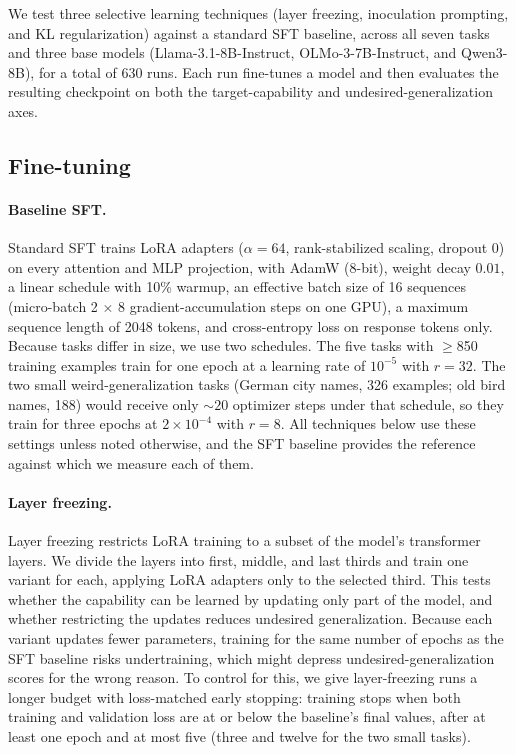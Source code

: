 \documentclass[11pt]{article}
\begin{document}
We test three selective learning techniques (layer freezing, inoculation prompting, and KL
regularization) against a standard SFT baseline, across all seven tasks and three base models
(Llama-3.1-8B-Instruct, OLMo-3-7B-Instruct, and Qwen3-8B), for a total of 630 runs. Each run
fine-tunes a model and then evaluates the resulting checkpoint on both the target-capability and
undesired-generalization axes.

\subsection{Fine-tuning}

\paragraph{Baseline SFT.}
Standard SFT trains LoRA adapters ($\alpha=64$, rank-stabilized scaling, dropout $0$) on every
attention and MLP projection, with AdamW (8-bit), weight decay $0.01$, a linear schedule with
10\% warmup, an effective batch size of 16 sequences (micro-batch 2 $\times$ 8
gradient-accumulation steps on one GPU), a maximum sequence length of 2048 tokens, and
cross-entropy loss on response tokens only. Because tasks differ in size, we use two schedules.
The five tasks with $\geq$850 training examples train for one epoch at a learning rate of
$10^{-5}$ with $r=32$. The two small weird-generalization tasks (German city names, 326 examples;
old bird names, 188) would receive only ${\sim}20$ optimizer steps under that schedule, so they
train for three epochs at $2\times10^{-4}$ with $r=8$. All techniques below use these settings
unless noted otherwise, and the SFT baseline provides the reference against which we measure
each of them.

\paragraph{Layer freezing.}
Layer freezing restricts LoRA training to a subset of the model's transformer layers. We divide
the layers into first, middle, and last thirds and train one variant for each, applying LoRA
adapters only to the selected third. This tests whether the capability can be learned by
updating only part of the model, and whether restricting the updates reduces undesired
generalization. Because each variant updates fewer parameters, training for the same number of
epochs as the SFT baseline risks undertraining, which might depress undesired-generalization
scores for the wrong reason. To control for this, we give layer-freezing runs a longer budget
with loss-matched early stopping: training stops when both training and validation loss are at
or below the baseline's final values, after at least one epoch and at most five (three and
twelve for the two small tasks).
\end{document}
